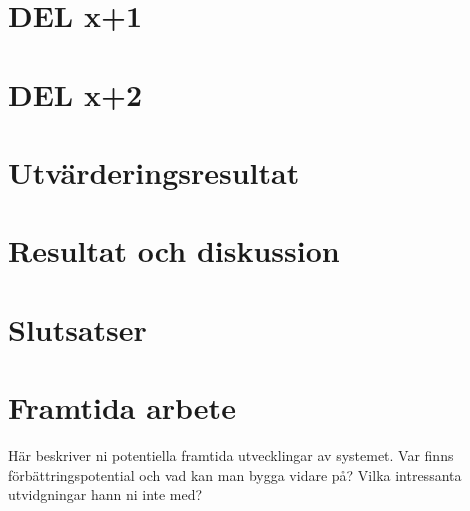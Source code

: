\documentclass[swedish, a4paper,12pt]{article}
\begin{document}
\section{DEL x+1}
\section{DEL x+2}


\section{Utvärderingsresultat}

\section{Resultat och diskussion}

\section{Slutsatser}

\section{Framtida arbete}
\iffalse Här beskriver ni potentiella framtida utvecklingar av systemet. Var finns förbättrings\-poten\-tial och vad kan man bygga vidare på? Vilka intressanta utvidgningar hann ni inte med?
\end{document}
